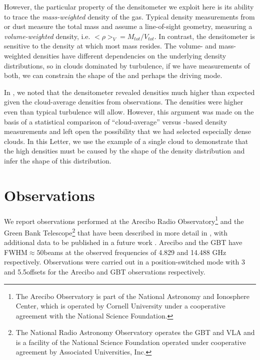 However, the particular property of the \formaldehyde densitometer we exploit
here is its ability to trace the \emph{mass-weighted} density of the gas.
Typical density measurements from \thirteenco or dust measure the total mass
and assume a line-of-sight geometry, measuring a \emph{volume-weighted}
density, i.e. $<\rho>_V = M_{tot}/V_{tot}$.  In contrast, the \formaldehyde
densitometer is sensitive to the density at which most mass resides.
The volume- and mass- weighted densities have different dependencies on the
underlying density distributions, so in clouds dominated by turbulence, if we
have measurements of both, we can constrain the shape of the \rhoPDF and
perhaps the driving mode.

In \citet{Ginsburg2011a}, we noted that the \formaldehyde densitometer revealed
densities much higher than expected given the cloud-average densities from
\thirteenco observations.  The densities were higher even than typical
turbulence will allow.  However, this argument was made on the basis of a
statistical comparison of ``cloud-average'' versus \formaldehyde-based density
measurements and left open the possibility that we had selected especially
dense clouds.  In this Letter, we use the example of a single cloud to
demonstrate that the high \formaldehyde densities must be caused by the shape
of the density distribution and infer the shape of this distribution.


\section{Observations}
We report \formaldehyde observations performed at the Arecibo Radio
Observatory\footnote{The Arecibo Observatory is part of the National Astronomy
and Ionosphere Center, which is operated by Cornell University under a
cooperative agreement with the National Science Foundation.  } and the Green
Bank Telescope\footnote{ The National Radio Astronomy Observatory operates the
GBT and VLA and is a facility of the National Science Foundation operated under
cooperative agreement by Associated Universities, Inc.  } that have been 
described in more detail in \citet{Ginsburg2011a}, with additional data to be
published in a future work .  Arecibo and
the GBT have FWHM$\approx50$\arcsec beams at the observed frequencies of 4.829
and 14.488 GHz respectively.  Observations were carried out in a
position-switched mode with 3 and 5.5\arcmin offsets for the Arecibo and GBT
observations respectively.

